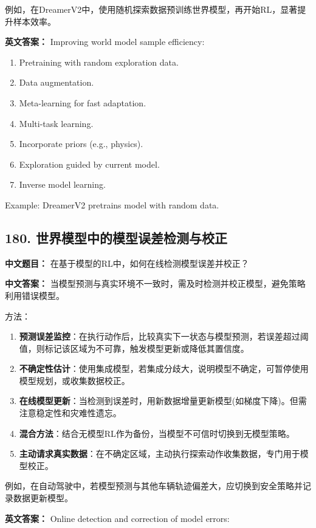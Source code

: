 \documentclass[10pt,a4paper]{ctexart}
\begin{document}
例如，在DreamerV2中，使用随机探索数据预训练世界模型，再开始RL，显著提升样本效率。

\textbf{英文答案：}  
Improving world model sample efficiency:

\begin{enumerate}
    \item Pretraining with random exploration data.
    \item Data augmentation.
    \item Meta-learning for fast adaptation.
    \item Multi-task learning.
    \item Incorporate priors (e.g., physics).
    \item Exploration guided by current model.
    \item Inverse model learning.
\end{enumerate}

Example: DreamerV2 pretrains model with random data.

\subsection*{180. 世界模型中的模型误差检测与校正}
\textbf{中文题目：} 在基于模型的RL中，如何在线检测模型误差并校正？

\textbf{中文答案：}  
当模型预测与真实环境不一致时，需及时检测并校正模型，避免策略利用错误模型。

方法：
\begin{enumerate}
    \item \textbf{预测误差监控}：在执行动作后，比较真实下一状态与模型预测，若误差超过阈值，则标记该区域为不可靠，触发模型更新或降低其置信度。
    \item \textbf{不确定性估计}：使用集成模型，若集成分歧大，说明模型不确定，可暂停使用模型规划，或收集数据校正。
    \item \textbf{在线模型更新}：当检测到误差时，用新数据增量更新模型(如梯度下降)。但需注意稳定性和灾难性遗忘。
    \item \textbf{混合方法}：结合无模型RL作为备份，当模型不可信时切换到无模型策略。
    \item \textbf{主动请求真实数据}：在不确定区域，主动执行探索动作收集数据，专门用于模型校正。
\end{enumerate}

例如，在自动驾驶中，若模型预测与其他车辆轨迹偏差大，应切换到安全策略并记录数据更新模型。

\textbf{英文答案：}  
Online detection and correction of model errors:
\end{document}
